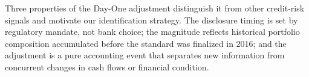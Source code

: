 \medskip\noindent
Three properties of the Day-One adjustment distinguish it from other credit-risk
signals and motivate our identification strategy.  The disclosure timing is set
by regulatory mandate, not bank choice; the magnitude reflects historical
portfolio composition accumulated before the standard was finalized in 2016; and
the adjustment is a pure accounting event that separates new information from
concurrent changes in cash flows or financial condition.
